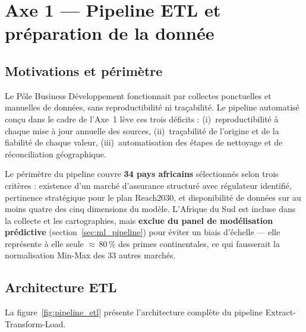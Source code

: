 \documentclass[12pt,a4paper]{report}
\begin{document}
\section{Axe 1 --- Pipeline ETL et préparation de la donnée}


\subsection{Motivations et périmètre}

Le Pôle Business Développement fonctionnait par collectes ponctuelles et manuelles de données, sans reproductibilité ni traçabilité. Le pipeline automatisé conçu dans le cadre de l'Axe~1 lève ces trois déficits : (i)~reproductibilité à chaque mise à jour annuelle des sources, (ii)~traçabilité de l'origine et de la fiabilité de chaque valeur, (iii)~automatisation des étapes de nettoyage et de réconciliation géographique.

Le périmètre du pipeline couvre \textbf{34 pays africains} sélectionnés selon trois critères : existence d'un marché d'assurance structuré avec régulateur identifié, pertinence stratégique pour le plan Reach2030, et disponibilité de données sur au moins quatre des cinq dimensions du modèle. L'Afrique du Sud est incluse dans la collecte et les cartographies, mais \textbf{exclue du panel de modélisation prédictive} (section~\ref{sec:ml_pipeline}) pour éviter un biais d'échelle --- elle représente à elle seule $\approx$\,80\,\% des primes continentales, ce qui fausserait la normalisation Min-Max des 33 autres marchés.

\subsection{Architecture ETL}

La figure~\ref{fig:pipeline_etl} présente l'architecture complète du pipeline Extract-Transform-Load.
\end{document}
